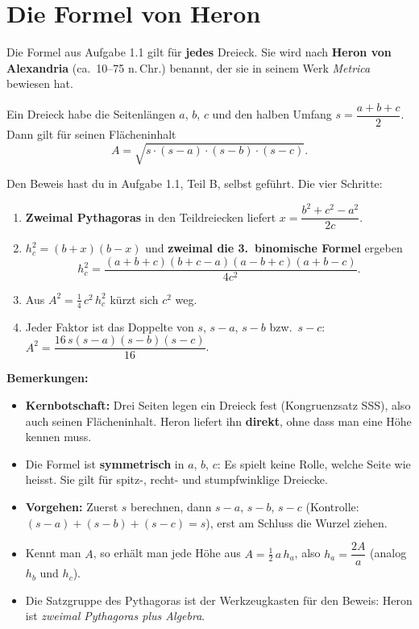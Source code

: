 \documentclass[11pt,oneside]{article}
\begin{document}
\section{Die Formel von Heron}
Die Formel aus Aufgabe 1.1 gilt für \textbf{jedes} Dreieck. Sie wird nach \textbf{Heron von Alexandria} (ca.\ 10--75 n.\,Chr.) benannt, der sie in seinem Werk \textit{Metrica} bewiesen hat.
\begin{satz}
	Ein Dreieck habe die Seitenlängen $a$, $b$, $c$ und den halben Umfang $s=\dfrac{a+b+c}{2}$. Dann gilt für seinen Flächeninhalt
	\[A=\sqrt{s\cdot(s-a)\cdot(s-b)\cdot(s-c)}.\]
\end{satz}
\begin{beweis}[Zusammenfassung]
	Den Beweis hast du in Aufgabe 1.1, Teil B, selbst geführt. Die vier Schritte:
	\begin{enumerate}[label=(\arabic*)]
		\item \textbf{Zweimal Pythagoras} in den Teildreiecken liefert $x=\dfrac{b^2+c^2-a^2}{2c}$.
		\item $h_c^2=(b+x)(b-x)$ und \textbf{zweimal die 3.\ binomische Formel} ergeben \[h_c^2=\frac{(a+b+c)(b+c-a)(a-b+c)(a+b-c)}{4c^2}.\]
		\item Aus $A^2=\frac14\,c^2\,h_c^2$ kürzt sich $c^2$ weg.
		\item Jeder Faktor ist das Doppelte von $s$, $s-a$, $s-b$ bzw.\ $s-c$: $A^2=\dfrac{16\,s(s-a)(s-b)(s-c)}{16}$.
	\end{enumerate}
\end{beweis}
\textbf{Bemerkungen:}
\begin{itemize}
	\item \textbf{Kernbotschaft:} Drei Seiten legen ein Dreieck fest (Kongruenzsatz SSS), also auch seinen Flächeninhalt. Heron liefert ihn \textbf{direkt}, ohne dass man eine Höhe kennen muss.
	\item Die Formel ist \textbf{symmetrisch} in $a$, $b$, $c$: Es spielt keine Rolle, welche Seite wie heisst. Sie gilt für spitz-, recht- und stumpfwinklige Dreiecke.
	\item \textbf{Vorgehen:} Zuerst $s$ berechnen, dann $s-a$, $s-b$, $s-c$ (Kontrolle: $(s-a)+(s-b)+(s-c)=s$), erst am Schluss die Wurzel ziehen.
	\item Kennt man $A$, so erhält man jede Höhe aus $A=\frac12\,a\,h_a$, also $h_a=\dfrac{2A}{a}$ (analog $h_b$ und $h_c$).
	\item Die Satzgruppe des Pythagoras ist der Werkzeugkasten für den Beweis: Heron ist \textit{zweimal Pythagoras plus Algebra}.
\end{itemize}
\end{document}
